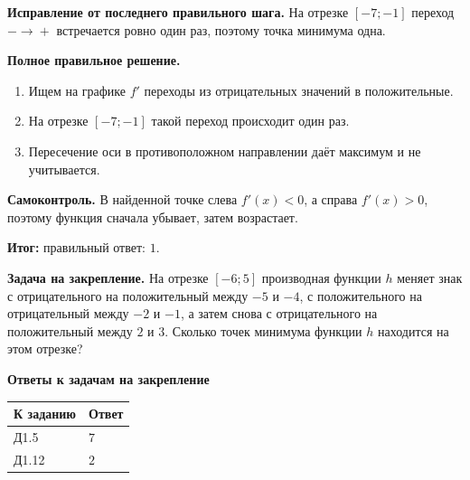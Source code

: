 \documentclass[a4paper,12pt]{article}
\newcommand{\resultmark}{\textcolor{resultcolor}{\textbf{Итог:}}}
\begin{document}
\textbf{Исправление от последнего правильного шага.}
На отрезке $[-7;-1]$ переход $-\!\to\!+$ встречается ровно один раз, поэтому точка минимума одна.

\textbf{Полное правильное решение.}
\begin{enumerate}
  \item Ищем на графике $f'$ переходы из отрицательных значений в положительные.
  \item На отрезке $[-7;-1]$ такой переход происходит один раз.
  \item Пересечение оси в противоположном направлении даёт максимум и не учитывается.
\end{enumerate}

\textbf{Самоконтроль.}
В найденной точке слева $f'(x)<0$, а справа $f'(x)>0$, поэтому функция сначала убывает, затем возрастает.

\resultmark{} правильный ответ: $1$.

\medskip
\textbf{\textcolor{accent}{Задача на закрепление.}}
На отрезке $[-6;5]$ производная функции $h$ меняет знак с отрицательного на положительный между $-5$ и $-4$, с положительного на отрицательный между $-2$ и $-1$, а затем снова с отрицательного на положительный между $2$ и $3$. Сколько точек минимума функции $h$ находится на этом отрезке?

\medskip
\textbf{\textcolor{accent}{Ответы к задачам на закрепление}}

\smallskip
\begin{tabular}{@{}ll@{}}
\toprule
\textbf{К заданию} & \textbf{Ответ} \\
\midrule
Д1.5 & $7$ \\
Д1.12 & $2$ \\
\bottomrule
\end{tabular}
\end{document}
